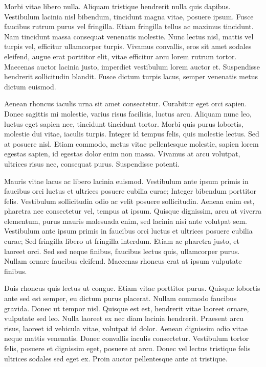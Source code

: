 \documentclass[12pt]{article}
\begin{document}
Morbi vitae libero nulla. Aliquam tristique hendrerit nulla quis dapibus. Vestibulum lacinia nisl bibendum, tincidunt magna vitae, posuere ipsum. Fusce faucibus rutrum purus vel fringilla. Etiam fringilla tellus ac maximus tincidunt. Nam tincidunt massa consequat venenatis molestie. Nunc lectus nisl, mattis vel turpis vel, efficitur ullamcorper turpis. Vivamus convallis, eros sit amet sodales eleifend, augue erat porttitor elit, vitae efficitur arcu lorem rutrum tortor. Maecenas auctor lacinia justo, imperdiet vestibulum lorem auctor et. Suspendisse hendrerit sollicitudin blandit. Fusce dictum turpis lacus, semper venenatis metus dictum euismod.

Aenean rhoncus iaculis urna sit amet consectetur. Curabitur eget orci sapien. Donec sagittis mi molestie, varius risus facilisis, luctus arcu. Aliquam nunc leo, luctus eget sapien nec, tincidunt tincidunt tortor. Morbi quis purus lobortis, molestie dui vitae, iaculis turpis. Integer id tempus felis, quis molestie lectus. Sed at posuere nisl. Etiam commodo, metus vitae pellentesque molestie, sapien lorem egestas sapien, id egestas dolor enim non massa. Vivamus at arcu volutpat, ultrices risus nec, consequat purus. Suspendisse potenti.

Mauris vitae lacus ac libero lacinia euismod. Vestibulum ante ipsum primis in faucibus orci luctus et ultrices posuere cubilia curae; Integer bibendum porttitor felis. Vestibulum sollicitudin odio ac velit posuere sollicitudin. Aenean enim est, pharetra nec consectetur vel, tempus at ipsum. Quisque dignissim, arcu at viverra elementum, purus mauris malesuada enim, sed lacinia nisi ante volutpat sem. Vestibulum ante ipsum primis in faucibus orci luctus et ultrices posuere cubilia curae; Sed fringilla libero ut fringilla interdum. Etiam ac pharetra justo, et laoreet orci. Sed sed neque finibus, faucibus lectus quis, ullamcorper purus. Nullam ornare faucibus eleifend. Maecenas rhoncus erat at ipsum vulputate finibus.

Duis rhoncus quis lectus ut congue. Etiam vitae porttitor purus. Quisque lobortis ante sed est semper, eu dictum purus placerat. Nullam commodo faucibus gravida. Donec ut tempor nisl. Quisque est est, hendrerit vitae laoreet ornare, vulputate sed leo. Nulla laoreet ex nec diam lacinia hendrerit. Praesent arcu risus, laoreet id vehicula vitae, volutpat id dolor. Aenean dignissim odio vitae neque mattis venenatis. Donec convallis iaculis consectetur. Vestibulum tortor felis, posuere et dignissim eget, posuere at arcu. Donec vel lectus tristique felis ultrices sodales sed eget ex. Proin auctor pellentesque ante at tristique.
\end{document}
